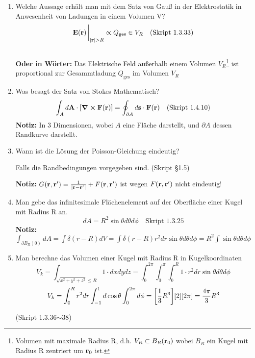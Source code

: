 \documentclass{scrartcl}
\newcommand{\rr}[1]{\frac{#1}{\abs{\vb{r}-\vb{r}'}}}
\newcommand{\ds}{\displaystyle}
\begin{document}
\begin{enumerate}
    \item Welche Aussage erhält man mit dem Satz von Gauß in der 
          Elektrostatik in Anwesenheit von Ladungen in einem Volumen V?
          $$\vb E(\vb r)\eval_{\abs{\vb r} > R}
            \propto Q_{\text{ges}}\in V_R
            \quad\text{(Skript 1.3.33)}$$\\
          \textbf{Oder in Wörter:} Das Elektrische Feld außerhalb 
          einem Volumen 
          $V_R$\footnote{Volumen mit 
            maximale Radius R, d.h. $V_R\subset B_R(\vb r_0)$ 
            wobei $B_R$ ein Kugel mit Radius R zentriert um $\vb r_0$ ist.}
          ist proportional zur Gesammtladung $Q_{\text{ges}}$ 
          im Volumen $V_R$

    \item Was besagt der Satz von Stokes Mathematisch?
          $$\ds \int_A d\vb A \cdot \qty[\curl \vb F(\vb r)]=
           \oint_{\partial A}d\vb s\cdot \vb F(\vb r)
           \quad\text{(Skript 1.4.10)}$$
          \textbf{Notiz:} In 3 Dimensionen, wobei $A$ eine Fläche 
          darstellt,
          und $\partial A$ dessen Randkurve darstellt.

    \item Wann ist die Lösung der Poisson-Gleichung eindeutig?
          \begin{center}
            Falls die Randbedingungen vorgegeben sind. (Skript §1.5)
          \end{center}
          \textbf{Notiz:} $G(\vb r, \vb r')=\rr{1} + F(\vb r, \vb r')$ 
          ist wegen $F(\vb r, \vb r')$ nicht eindeutig!
          
    \item Man gebe das infinitesimale Flächenelement auf der Oberfläche 
          einer Kugel mit Radius R an.
          $$\ds dA = R^2\sin\theta d\theta d\phi
          \quad\text{Skript 1.3.25}$$
          \textbf{Notiz:} $\ds\int_{\partial B_R(0)} dA=\int\delta(r-R)dV
           =\int \delta(r-R)r^2dr\sin\theta d\theta d\phi
           =R^2 \int \sin\theta d\theta d\phi$

    \item Man berechne das Volumen einer Kugel mit Radius R 
          in Kugelkoordinaten\\
          $$\ds V_k=\int_{\sqrt{x^2+y^2+z^2}\le R} 1\cdot dxdydz
           =\int_0^{2\pi}\int_0^\pi\int_0^R 1\cdot r^2dr 
            \sin\theta d\theta d\phi$$
          $$\ds V_k=\int_0^R r^2 dr \int_{-1}^{1} d\cos\theta 
                   \int_0^{2\pi}d\phi
           =\qty[\frac{1}{3}R^3]\qty[2]\qty[2\pi]=\frac{4\pi}{3}R^3$$
          \begin{center}
            (Skript 1.3.36$\sim$38)
          \end{center}


\end{enumerate}
\end{document}
